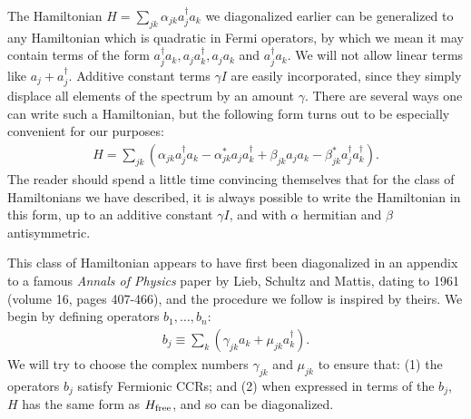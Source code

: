 \documentclass[12pt]{article}
\begin{document}
The Hamiltonian $H = \sum_{jk} \alpha_{jk} a_j^\dagger a_k$ we
diagonalized earlier can be generalized to any Hamiltonian which is
quadratic in Fermi operators, by which we mean it may contain terms of
the form $a^\dagger_j a_k, a_j a_k^\dagger, a_j a_k$ and $a_j^\dagger
a_k$.  We will not allow linear terms like $a_j+a_j^\dagger$.
Additive constant terms $\gamma I$ are easily incorporated, since they
simply displace all elements of the spectrum by an amount $\gamma$.
There are several ways one can write such a Hamiltonian, but the
following form turns out to be especially convenient for our purposes:
\begin{eqnarray}
  H = \sum_{jk} \left( \alpha_{jk} a_j^\dagger a_k -\alpha^*_{jk} a_j a_k^\dagger +
  \beta_{jk} a_j a_k - \beta^*_{jk} a_j^\dagger a_k^\dagger \right).
\end{eqnarray}
The reader should spend a little time convincing themselves that for
the class of Hamiltonians we have described, it is always possible to
write the Hamiltonian in this form, up to an additive constant $\gamma
I$, and with $\alpha$ hermitian and $\beta$ antisymmetric.

This class of Hamiltonian appears to have first been diagonalized in
an appendix to a famous \emph{Annals of Physics} paper by Lieb,
Schultz and Mattis, dating to 1961 (volume 16, pages 407-466), and the
procedure we follow is inspired by theirs.  We begin by defining
operators $b_1,\ldots,b_n$:
\begin{eqnarray}
  b_j \equiv \sum_k \left( \gamma_{jk} a_k + \mu_{jk} a_k^\dagger \right).
\end{eqnarray}
We will try to choose the complex numbers $\gamma_{jk}$ and $\mu_{jk}$
to ensure that: (1) the operators $b_j$ satisfy Fermionic CCRs; and
(2) when expressed in terms of the $b_j$, $H$ has the same form as
$H_{\rm free}$, and so can be diagonalized.
\end{document}
